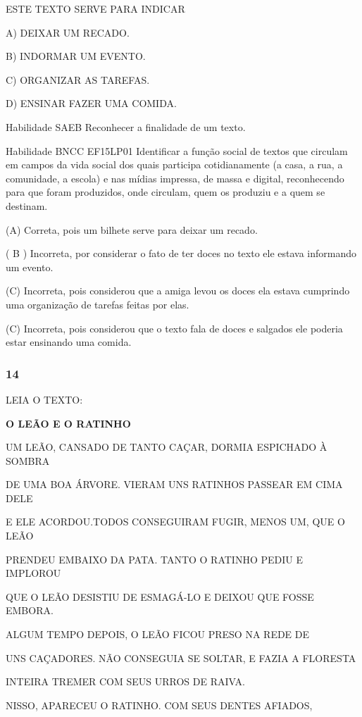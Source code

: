 \begin{escola}
ESTE TEXTO SERVE PARA INDICAR

A) DEIXAR UM RECADO.

B) INDORMAR UM EVENTO.

C) ORGANIZAR AS TAREFAS.

D) ENSINAR FAZER UMA COMIDA.

Habilidade SAEB Reconhecer a finalidade de um texto.

Habilidade BNCC EF15LP01 Identificar a função social de textos que
circulam em campos da vida social dos quais participa cotidianamente (a
casa, a rua, a comunidade, a escola) e nas mídias impressa, de massa e
digital, reconhecendo para que foram produzidos, onde circulam, quem os
produziu e a quem se destinam.

(A) Correta, pois um bilhete serve para deixar um recado.

( B ) Incorreta, por considerar o fato de ter doces no texto ele estava
informando um evento.

(C) Incorreta, pois considerou que a amiga levou os doces ela estava
cumprindo uma organização de tarefas feitas por elas.

(C) Incorreta, pois considerou que o texto fala de doces e salgados ele
poderia estar ensinando uma
comida.\protect\hypertarget{_heading=h.xdbqd2s8fd2q}{}{}

\subsubsection{14}\label{section-54}

LEIA O TEXTO:

\textbf{O LEÃO E O RATINHO}

UM LEÃO, CANSADO DE TANTO CAÇAR, DORMIA ESPICHADO À SOMBRA

DE UMA BOA ÁRVORE. VIERAM UNS RATINHOS PASSEAR EM CIMA DELE

E ELE ACORDOU.TODOS CONSEGUIRAM FUGIR, MENOS UM, QUE O LEÃO

PRENDEU EMBAIXO DA PATA. TANTO O RATINHO PEDIU E IMPLOROU

QUE O LEÃO DESISTIU DE ESMAGÁ-LO E DEIXOU QUE FOSSE EMBORA.

ALGUM TEMPO DEPOIS, O LEÃO FICOU PRESO NA REDE DE

UNS CAÇADORES. NÃO CONSEGUIA SE SOLTAR, E FAZIA A FLORESTA

INTEIRA TREMER COM SEUS URROS DE RAIVA.

NISSO, APARECEU O RATINHO. COM SEUS DENTES AFIADOS,


\end{escola}

